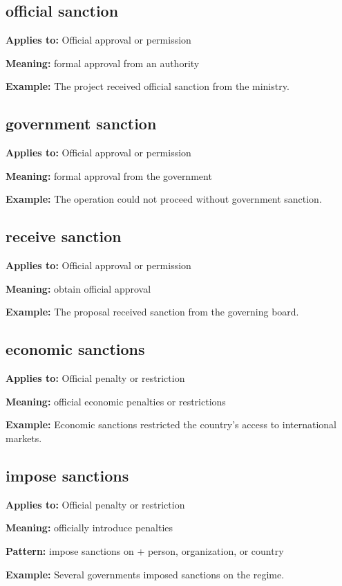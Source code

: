 \documentclass[11pt]{article}
\begin{document}
\subsection{official sanction}
\textbf{Applies to:} Official approval or permission

\textbf{Meaning:} formal approval from an authority

\textbf{Example:} The project received official sanction from the ministry.

\subsection{government sanction}
\textbf{Applies to:} Official approval or permission

\textbf{Meaning:} formal approval from the government

\textbf{Example:} The operation could not proceed without government sanction.

\subsection{receive sanction}
\textbf{Applies to:} Official approval or permission

\textbf{Meaning:} obtain official approval

\textbf{Example:} The proposal received sanction from the governing board.

\subsection{economic sanctions}
\textbf{Applies to:} Official penalty or restriction

\textbf{Meaning:} official economic penalties or restrictions

\textbf{Example:} Economic sanctions restricted the country's access to international markets.

\subsection{impose sanctions}
\textbf{Applies to:} Official penalty or restriction

\textbf{Meaning:} officially introduce penalties

\textbf{Pattern:} impose sanctions on + person, organization, or country

\textbf{Example:} Several governments imposed sanctions on the regime.
\end{document}
